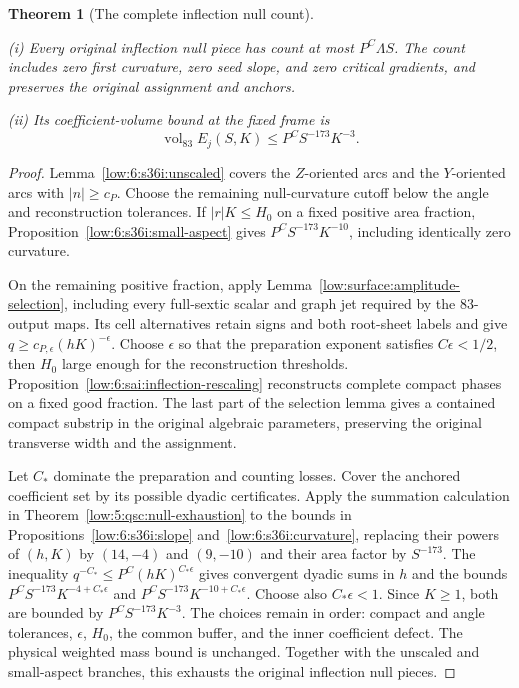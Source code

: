 \documentclass[11pt]{amsart}
\newtheorem{theorem}{Theorem}[section]
\theoremstyle{definition}
\theoremstyle{remark}
\numberwithin{equation}{section}
\begin{document}
\begin{theorem}[The complete inflection null count]\label{low:6:s36i:null-count}

\noindent\textup{(i)} Every original inflection null piece has count at most $P^C\Lambda S$. The count includes zero first curvature, zero seed slope, and zero critical gradients, and preserves the original assignment and anchors.

\noindent\textup{(ii)} Its coefficient-volume bound at the fixed frame is
\[
\operatorname{vol}_{83}E_j(S,K)\le P^CS^{-173}K^{-3}.
\]
\end{theorem}
\begin{proof}
Lemma~\ref{low:6:s36i:unscaled} covers the $Z$-oriented arcs and the $Y$-oriented arcs with $|n|\ge c_P$. Choose the remaining null-curvature cutoff below the angle and reconstruction tolerances. If $|r|K\le H_0$ on a fixed positive area fraction, Proposition~\ref{low:6:s36i:small-aspect} gives $P^CS^{-173}K^{-10}$, including identically zero curvature.

On the remaining positive fraction, apply Lemma~\ref{low:surface:amplitude-selection}, including every full-sextic scalar and graph jet required by the $83$-output maps. Its cell alternatives retain signs and both root-sheet labels and give $q\ge c_{P,\epsilon}(hK)^{-\epsilon}$. Choose $\epsilon$ so that the preparation exponent satisfies $C\epsilon<1/2$, then $H_0$ large enough for the reconstruction thresholds. Proposition~\ref{low:6:sai:inflection-rescaling} reconstructs complete compact phases on a fixed good fraction. The last part of the selection lemma gives a contained compact substrip in the original algebraic parameters, preserving the original transverse width and the assignment.

Let $C_*$ dominate the preparation and counting losses. Cover the anchored coefficient set by its possible dyadic certificates. Apply the summation calculation in Theorem~\ref{low:5:qsc:null-exhaustion} to the bounds in Propositions~\ref{low:6:s36i:slope} and~\ref{low:6:s36i:curvature}, replacing their powers of $(h,K)$ by $(14,-4)$ and $(9,-10)$ and their area factor by $S^{-173}$. The inequality $q^{-C_*}\le P^C(hK)^{C_*\epsilon}$ gives convergent dyadic sums in $h$ and the bounds $P^CS^{-173}K^{-4+C_*\epsilon}$ and $P^CS^{-173}K^{-10+C_*\epsilon}$. Choose also $C_*\epsilon<1$. Since $K\ge1$, both are bounded by $P^CS^{-173}K^{-3}$. The choices remain in order: compact and angle tolerances, $\epsilon$, $H_0$, the common buffer, and the inner coefficient defect. The physical weighted mass bound is unchanged. Together with the unscaled and small-aspect branches, this exhausts the original inflection null pieces.
\end{proof}
\end{document}
